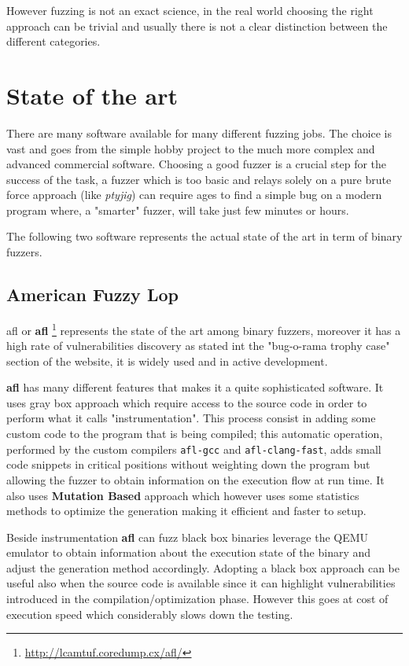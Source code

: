 \documentclass[../main.tex]{subfiles}
\begin{document}
However fuzzing is not an exact science, in the real world choosing the right approach can be trivial and usually there is not a clear distinction between the different categories.


\section{State of the art}
There are many software available for many different fuzzing jobs. The choice is vast and goes from the simple hobby project to the much more complex and advanced commercial software. Choosing a good fuzzer is a crucial step for the success of the task, a fuzzer which is too basic and relays solely on a pure brute force approach (like \textit{ptyjig}) can require ages to find a simple bug on a modern program where, a "smarter" fuzzer, will take just few minutes or hours.

The following two software represents the actual state of the art in term of binary fuzzers.

\subsection{American Fuzzy Lop}

\acrlong{afl} or \textbf{\acrshort{afl}} \footnote{\url{http://lcamtuf.coredump.cx/afl/}} represents the state of the art among binary fuzzers, moreover it has a high rate of vulnerabilities discovery as stated int the "bug-o-rama trophy case" section of the website, it is widely used and in active development.

\textbf{\acrshort{afl}} has many different features that makes it a quite sophisticated software. It uses gray box approach which require access to the source code in order to perform what it calls "instrumentation". This process consist in adding some custom code to the program that is being compiled; this automatic operation, performed by the custom compilers \texttt{afl-gcc} and \texttt{afl-clang-fast}, adds small code snippets in critical positions without weighting down the program but allowing the fuzzer to obtain information on the execution flow at run time. It also uses \textbf{Mutation Based} approach which however uses some statistics methods to optimize the generation making it efficient and faster to setup.

Beside instrumentation \textbf{\acrshort{afl}} can fuzz black box binaries leverage the QEMU emulator to obtain information about the execution state of the binary and adjust the generation method accordingly. Adopting a black box approach can be useful also when the source code is available since it can highlight vulnerabilities introduced in the compilation/optimization phase. However this goes at cost of execution speed which considerably slows down the testing.
\end{document}
